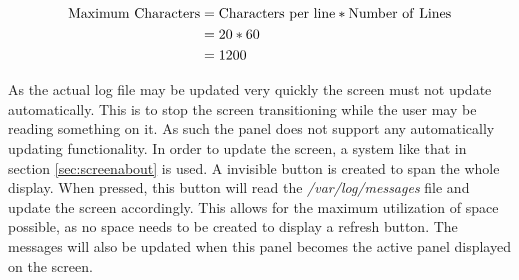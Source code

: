 \begin{align}
\label{eq:maximumdisplaycharacters}
\mathrm{Maximum\ Characters} &= \mathrm{Characters\ per\ line}* \mathrm{Number\ of \ Lines} \\
&= 20*60 \notag \\
&=1200 \notag 
\end{align}

As the actual log file may be updated very quickly the screen must not update automatically. This is to stop the screen transitioning while the user may be reading something on it. As such the panel does not support any automatically updating functionality. In order to update the screen, a system like that in section \ref{sec:screenabout} is used. A invisible button is created to span the whole display. When pressed, this button will read the \emph{/var/log/messages} file and update the screen accordingly. This allows for the maximum utilization of space possible, as no space needs to be created to display a refresh button. The messages will also be updated when this panel becomes the active panel displayed on the screen.



